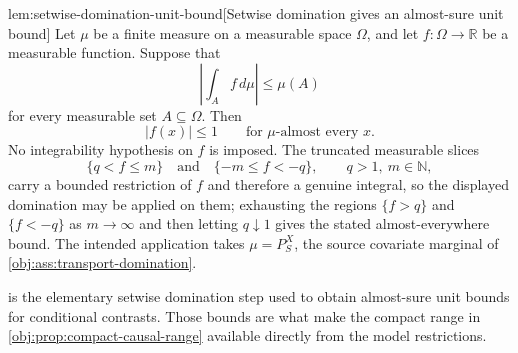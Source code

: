 \begin{lemmav}{lem:setwise-domination-unit-bound}[Setwise domination gives an almost-sure unit bound]
Let \(\mu\) be a finite measure on a measurable space \(\Omega\), and let \(f:\Omega\to\mathbb R\) be a measurable function. Suppose that
\[
\left|\int_A f\,d\mu\right|\le\mu(A)
\]
for every measurable set \(A\subseteq\Omega\). Then
\[
|f(x)|\le 1\qquad\text{for }\mu\text{-almost every }x .
\]
No integrability hypothesis on \(f\) is imposed. The truncated measurable slices
\[
\{q<f\le m\}\quad\text{and}\quad\{-m\le f<-q\},\qquad q>1,\ m\in\mathbb N,
\]
carry a bounded restriction of \(f\) and therefore a genuine integral, so the displayed domination may be applied on them; exhausting the regions \(\{f>q\}\) and \(\{f<-q\}\) as \(m\to\infty\) and then letting \(q\downarrow 1\) gives the stated almost-everywhere bound. The intended application takes \(\mu=P_S^X\), the source covariate marginal of \cref{obj:ass:transport-domination}.
\end{lemmav}

 is the elementary setwise domination step used to obtain almost-sure unit bounds for conditional contrasts. Those bounds are what make the compact range in \cref{obj:prop:compact-causal-range} available directly from the model restrictions.

